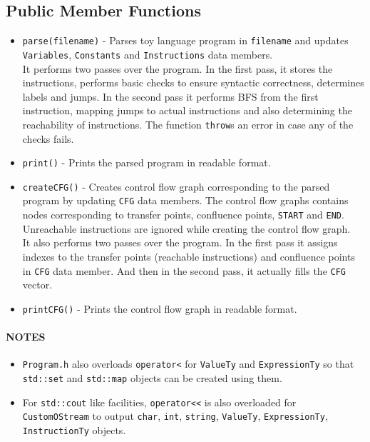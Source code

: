 \subsection{Public Member Functions}
\label{subsec:PublicMemberFunctionsProgramH}
\begin{itemize}
    \item \texttt{parse(filename)} - Parses toy language program in 
    \texttt{filename} and updates \texttt{Variables}, \texttt{Constants} and 
    \texttt{Instructions} data members.\\
    It performs two passes over the program. In the first pass, it stores the 
    instructions, performs basic checks to ensure syntactic correctness, 
    determines labels and jumps. In the second pass it performs BFS from the 
    first instruction, mapping jumps to actual instructions and also 
    determining the reachability of instructions. The function \texttt{throw}s 
    an error in case any of the checks fails.
    \item \texttt{print()} - Prints the parsed program in readable format.
    \item \texttt{createCFG()} - Creates control flow graph corresponding to the
    parsed program by updating \texttt{CFG} data members. The control flow 
    graphs contains nodes corresponding to transfer points, confluence points, 
    \texttt{START} and \texttt{END}. Unreachable instructions are ignored while 
    creating the control flow graph.\\
    It also performs two passes over the program. In the first pass it assigns 
    indexes to the transfer points (reachable instructions) and confluence 
    points in \texttt{CFG} data member. And then in the second pass, it actually
    fills the \texttt{CFG} vector.
    \item \texttt{printCFG()} - Prints the control flow graph in readable format.
\end{itemize}

\paragraph{NOTES}
\begin{itemize} \tightlist
    \item \texttt{Program.h} also overloads \texttt{operator<} for 
    \texttt{ValueTy} and \texttt{ExpressionTy} so that \texttt{std::set} and 
    \texttt{std::map} objects can be created using them.
    \item For \texttt{std::cout} like facilities, \texttt{operator<<} is also 
    overloaded for \texttt{CustomOStream} to output \texttt{char}, 
    \texttt{int}, \texttt{string}, \texttt{ValueTy}, \texttt{ExpressionTy}, 
    \texttt{InstructionTy} objects.
\end{itemize}

